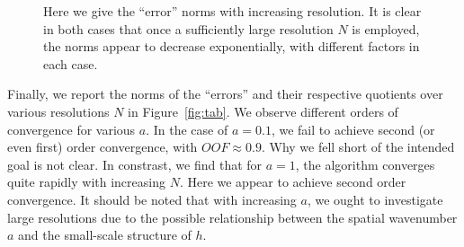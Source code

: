 \documentclass[10pt]{article}
\begin{document}
\begin{figure}[H]
    \centering
    \vspace{0.3cm}
    \caption{Here we give the ``error'' norms with increasing resolution. It is clear in both cases that once a sufficiently large resolution $N$ is employed, the norms appear to decrease exponentially, with different factors in each case.}
    \label{fig:error}
\end{figure}

\clearpage
\vfill
\vfill
Finally, we report the norms of the ``errors'' and their respective quotients over various resolutions $N$ in Figure~\ref{fig:tab}.
We observe different orders of convergence for various $a$.
In the case of $a = 0.1$, we fail to achieve second (or even first) order convergence, with $OOF \approx 0.9$.
Why we fell short of the intended goal is not clear.
In constrast, we find that for $a = 1$, the algorithm converges quite rapidly with increasing $N$.
Here we appear to achieve second order convergence.
It should be noted that with increasing $a$, we ought to investigate large resolutions due to the possible relationship between the spatial wavenumber $a$ and the small-scale structure of $h$.
\vfill
\end{document}
